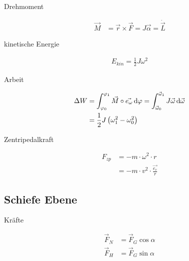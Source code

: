 \begin{boxleft}Drehmoment
\end{boxleft}\begin{boxrightshaded}
\begin{align}
\vec{M}&=\vec{r}\times\vec{F}=J\vec{\alpha}=\dot{\vec{L}}
\end{align}
\end{boxrightshaded}

\begin{boxleft}kinetische Energie
\end{boxleft}\begin{boxrightshaded}
\begin{align}
E_{kin}=\frac{1}{2}J\omega^2
\end{align}
\end{boxrightshaded}

\begin{boxleft}Arbeit
\end{boxleft}\begin{boxrightshaded}
\begin{align}
\Delta W	&=\int_{\varphi_0}^{\varphi_1}\vec{M}\circ\vec{e_\omega}\mathop{}\!\mathrm{d} \varphi=\int_{\vec{\omega}_0}^{\vec{\omega}_1}J\vec{\omega}\mathop{}\!\mathrm{d}\vec{\omega}\\
&=\frac{1}{2}J\left(\omega_1^2-\omega_0^2\right)
\end{align}
\end{boxrightshaded}

\begin{boxleft}Zentripedalkraft
\end{boxleft}\begin{boxrightshaded}
\begin{align}
F_{zp}&=-m\cdot\omega^2\cdot r\\
&=-m\cdot v^2\cdot \frac{\vec{e_r}}{r}
\end{align}
\end{boxrightshaded}

\subsection{Schiefe Ebene}

\begin{boxleft}Kräfte
\end{boxleft}\begin{boxrightshaded}
\begin{align}
\vec{F}_N&=\vec{F}_G\cos\alpha\\
\vec{F}_H&=\vec{F}_G\sin\alpha
\end{align}
\end{boxrightshaded}

